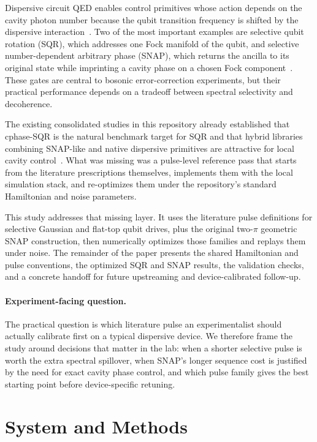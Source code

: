 \documentclass[aps,pra,twocolumn,reprint,amsmath,amssymb]{revtex4-2}
\begin{document}
Dispersive circuit QED enables control primitives whose action depends on the cavity photon number because the qubit transition frequency is shifted by the dispersive interaction~\cite{koch2007transmon,blais2021circuit}. Two of the most important examples are selective qubit rotation (SQR), which addresses one Fock manifold of the qubit, and selective number-dependent arbitrary phase (SNAP), which returns the ancilla to its original state while imprinting a cavity phase on a chosen Fock component~\cite{heeres2015snap,krastanov2015universal,heeres2017logical}. These gates are central to bosonic error-correction experiments, but their practical performance depends on a tradeoff between spectral selectivity and decoherence.

The existing consolidated studies in this repository already established that cphase-SQR is the natural benchmark target for SQR and that hybrid libraries combining SNAP-like and native dispersive primitives are attractive for local cavity control~\cite{heeres2017logical}. What was missing was a pulse-level reference pass that starts from the literature prescriptions themselves, implements them with the local simulation stack, and re-optimizes them under the repository's standard Hamiltonian and noise parameters.

This study addresses that missing layer. It uses the literature pulse definitions for selective Gaussian and flat-top qubit drives, plus the original two-$\pi$ geometric SNAP construction, then numerically optimizes those families and replays them under noise. The remainder of the paper presents the shared Hamiltonian and pulse conventions, the optimized SQR and SNAP results, the validation checks, and a concrete handoff for future upstreaming and device-calibrated follow-up.

\paragraph{Experiment-facing question.}
The practical question is which literature pulse an experimentalist should actually calibrate first on a typical dispersive device. We therefore frame the study around decisions that matter in the lab: when a shorter selective pulse is worth the extra spectral spillover, when SNAP's longer sequence cost is justified by the need for exact cavity phase control, and which pulse family gives the best starting point before device-specific retuning.

\section{System and Methods}
\end{document}
